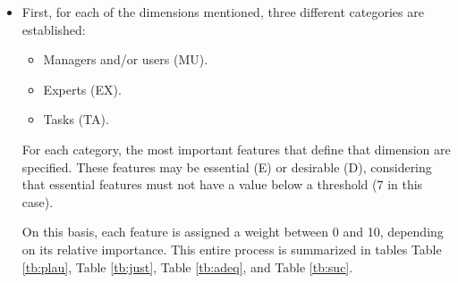 \begin{itemize}
\item First, for each of the dimensions mentioned, three different categories are established:

	\begin{itemize}
	\item Managers and/or users (MU).
	\item Experts (EX).
	\item Tasks (TA).
	\end{itemize}
	
	For each category, the most important features that define that dimension are specified. These features may be essential (E) or desirable (D), considering that essential features must not have a value below a threshold (7 in this case).
	
	On this basis, each feature is assigned a weight between 0 and 10, depending on its relative importance. This entire process is summarized in tables Table \ref{tb:plau}, Table \ref{tb:just}, Table \ref{tb:adeq}, and Table \ref{tb:suc}.


\end{itemize}
